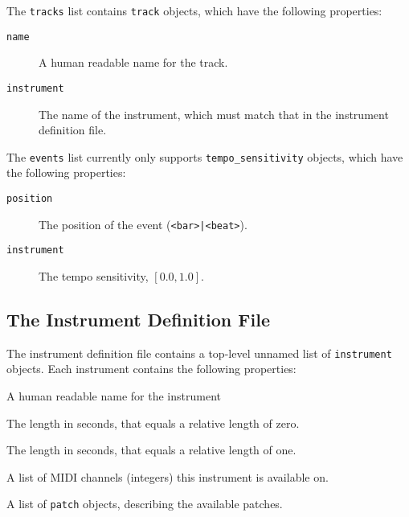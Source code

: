 \documentclass[12pt,a4paper]{article}
\begin{document}
The \texttt{tracks} list contains \texttt{track} objects, 
which have the following properties:
\begin{description}
\item[\texttt{name}] A human readable name for the track.
\item[\texttt{instrument}] The name of the instrument, which must match that in the instrument definition file.
\end{description}

The \texttt{events} list currently only supports
\texttt{tempo\_sensitivity} objects,
which have the following properties:
\begin{description}
\item[\texttt{position}] The position of the event (\texttt{<bar>|<beat>}).
\item[\texttt{instrument}] The tempo sensitivity, $[0.0, 1.0]$.
\end{description}

\subsection{The Instrument Definition File}
\label{sec:instrument_definition_files}

The instrument definition file contains a
top-level unnamed list of \texttt{instrument} objects.
Each instrument contains the following properties:
\begin{description}[leftmargin=32ex]
\item[\texttt{name}] A human readable name for the instrument
\item[\texttt{shortest\_note\_threshold}] The length in seconds, that equals a relative length of zero.
\item[\texttt{longest\_note\_threshold}] The length in seconds, that equals a relative length of one.
\item[\texttt{channels}] A list of MIDI channels (integers) this instrument is available on.
\item[\texttt{patches}] A list of \texttt{patch} objects, describing the available patches.
\end{description}
\end{document}
